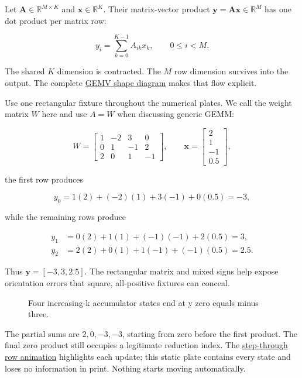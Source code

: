 \documentclass[
  10pt,
]{article}
\begin{document}
Let \(\mathbf{A}\in\mathbb{R}^{M\times K}\) and
\(\mathbf{x}\in\mathbb{R}^{K}\). Their matrix-vector product
\(\mathbf{y}=\mathbf{A}\mathbf{x}\in\mathbb{R}^{M}\) has one dot product
per matrix row:

\[
y_i=\sum_{k=0}^{K-1}A_{ik}x_k,
\qquad 0\le i<M.
\]

The shared \(K\) dimension is contracted. The \(M\) row dimension
survives into the output. The complete
\href{https://github.com/hermonai/inside-the-llm-engine/blob/astra-visual-rewrite/diagrams/linear/gemv-shape-contract.txt}{GEMV
shape diagram} makes that flow explicit.

Use one rectangular fixture throughout the numerical plates. We call the
weight matrix \(W\) here and use \(A=W\) when discussing generic GEMM:

\[
W=
\begin{bmatrix}
1&-2&3&0\\
0&1&-1&2\\
2&0&1&-1
\end{bmatrix},
\qquad
\mathbf{x}=
\begin{bmatrix}
2\\1\\-1\\0.5
\end{bmatrix},
\]

the first row produces

\[
y_0=1(2)+(-2)(1)+3(-1)+0(0.5)=-3,
\]

while the remaining rows produce

\[
\begin{aligned}
y_1&=0(2)+1(1)+(-1)(-1)+2(0.5)=3,\\
y_2&=2(2)+0(1)+1(-1)+(-1)(0.5)=2.5.
\end{aligned}
\]

Thus \(\mathbf{y}=[-3,3,2.5]\). The rectangular matrix and mixed signs
help expose orientation errors that square, all-positive fixtures can
conceal.

\begin{figure}[H]\centering\resizebox{\linewidth}{!}{}\caption{Four increasing-k accumulator states end at y zero equals minus three.}\end{figure}

The partial sums are \(2,0,-3,-3\), starting from zero before the first
product. The final zero product still occupies a legitimate reduction
index. The
\href{https://github.com/hermonai/inside-the-llm-engine/blob/astra-visual-rewrite/figures/generated/ch06-row.html}{step-through
row animation} highlights each update; this static plate contains every
state and loses no information in print. Nothing starts moving
automatically.
\end{document}
